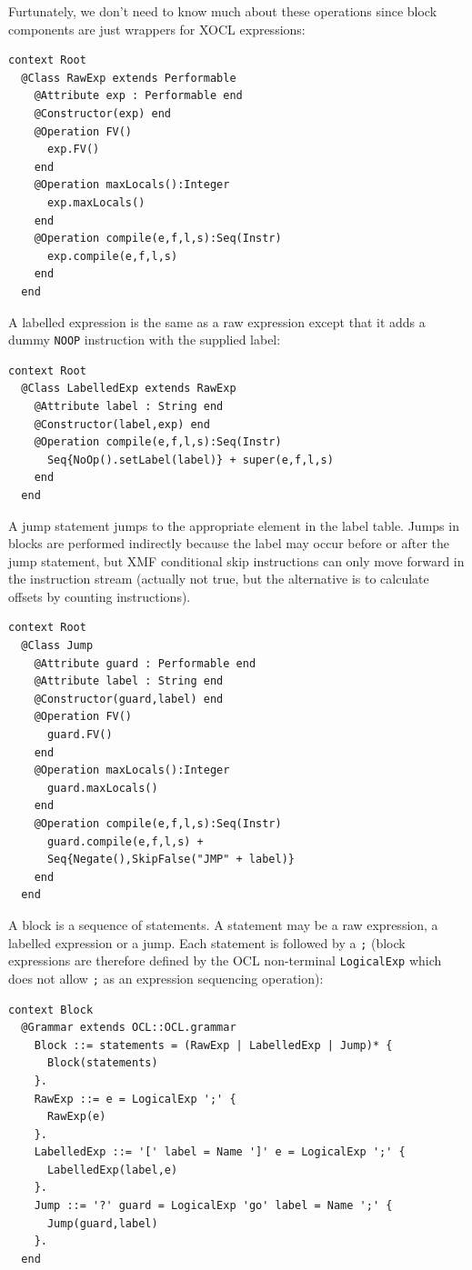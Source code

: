 \documentclass{article}
\begin{document}
Furtunately, we don't need to know much about these operations since block components
are just wrappers for XOCL expressions:   
\begin{verbatim}
context Root
  @Class RawExp extends Performable
    @Attribute exp : Performable end
    @Constructor(exp) end
    @Operation FV()
      exp.FV()
    end
    @Operation maxLocals():Integer
      exp.maxLocals()
    end
    @Operation compile(e,f,l,s):Seq(Instr)
      exp.compile(e,f,l,s)
    end
  end
\end{verbatim}
A labelled expression is the same as a raw expression except that it adds a dummy {\tt NOOP}
instruction with the supplied label:
\begin{verbatim}
context Root
  @Class LabelledExp extends RawExp
    @Attribute label : String end
    @Constructor(label,exp) end
    @Operation compile(e,f,l,s):Seq(Instr)
      Seq{NoOp().setLabel(label)} + super(e,f,l,s)
    end
  end
\end{verbatim}
A jump statement jumps to the appropriate element in the label table. Jumps in
blocks are performed indirectly because the label may occur before or after the
jump statement, but XMF conditional skip instructions can only move forward
in the instruction stream (actually not true, but the alternative is to calculate
offsets by counting instructions).
\begin{verbatim}
context Root
  @Class Jump
    @Attribute guard : Performable end
    @Attribute label : String end
    @Constructor(guard,label) end
    @Operation FV()
      guard.FV()
    end
    @Operation maxLocals():Integer
      guard.maxLocals()
    end
    @Operation compile(e,f,l,s):Seq(Instr)
      guard.compile(e,f,l,s) + 
      Seq{Negate(),SkipFalse("JMP" + label)}
    end
  end
\end{verbatim}
A block is a sequence of statements. A statement may be a raw expression,
a labelled expression or a jump. Each statement is followed by a {\tt ;}
(block expressions are therefore defined by the OCL non-terminal {\tt LogicalExp}
which does not allow {\tt ;} as an expression sequencing operation):
\begin{verbatim}
context Block
  @Grammar extends OCL::OCL.grammar
    Block ::= statements = (RawExp | LabelledExp | Jump)* { 
      Block(statements) 
    }.
    RawExp ::= e = LogicalExp ';' { 
      RawExp(e) 
    }.
    LabelledExp ::= '[' label = Name ']' e = LogicalExp ';' { 
      LabelledExp(label,e) 
    }.
    Jump ::= '?' guard = LogicalExp 'go' label = Name ';' { 
      Jump(guard,label) 
    }.
  end
\end{verbatim}
\end{document}
